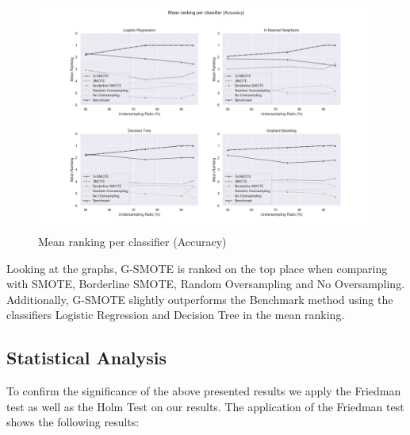 \documentclass[parskip=full]{scrartcl}
\begin{document}
\begin{figure}[H]
	\includegraphics[width=1\linewidth]
		{resources/mean_ranking_per_classifier_accuracy}
	\caption{Mean ranking per classifier (Accuracy)}
	\label{fig:mean_ranking_per_classifier_accuracy}
\end{figure}

Looking at the graphs, G-SMOTE is ranked on the top place when comparing with 
SMOTE, Borderline SMOTE, Random Oversampling and No Oversampling. Additionally, 
G-SMOTE slightly outperforms the Benchmark method using the classifiers 
Logistic Regression and Decision Tree in the mean ranking. 

\subsection{Statistical Analysis}

To confirm the significance of the above presented results we apply the 
Friedman test as well as the Holm Test on our results. The application of the 
Friedman test shows the following results:
\end{document}
